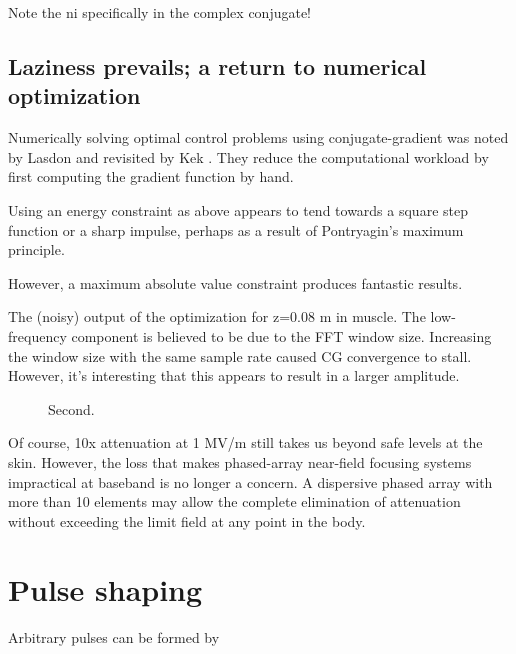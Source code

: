 \documentclass[paper.tex]{subfiles}
\begin{document}
Note the ni specifically in the complex conjugate!


\subsection{Laziness prevails; a return to numerical optimization}

Numerically solving optimal control problems using conjugate-gradient was noted by Lasdon \cite{conjugate1967} and 
revisited by Kek \cite{Conjugate}. They reduce the computational workload by first computing the 
gradient function by hand.

Using an energy constraint as above appears to tend towards a square step function or a sharp impulse, perhaps as a result of Pontryagin's maximum principle\cite{Optimum1964}.


However, a maximum absolute value constraint produces fantastic results.


\begin{figure}[H]
	
	\caption{}
\end{figure}


The (noisy) output of the optimization for z=0.08 m in muscle. The low-frequency component is believed to be due to the FFT window size. Increasing the window size with the same sample rate caused CG convergence to stall. However, it's interesting that this appears to result in a larger amplitude. 


\begin{figure}[H]
	
	\caption{Second.}
\end{figure}


\begin{figure}[H]
	
	\caption{}
\end{figure}

Of course, 10x attenuation at 1 MV/m still takes us beyond safe levels at the skin. However, the loss that makes phased-array near-field focusing systems impractical at baseband is no longer a concern. A dispersive phased array with more than 10 elements may allow the complete elimination of attenuation without exceeding the limit field at any point in the body. 


\section{Pulse shaping}


Arbitrary pulses can be formed by 
\end{document}
